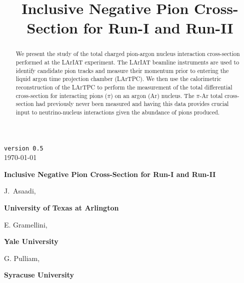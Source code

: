 \documentclass[a4paper]{article}
\title{Inclusive Negative Pion Cross-Section for Run-I and Run-II}
\begin{document}
\def\Journal#1#2#3#4{{#1} {\bf #2}, #3 (#4)}
\def\etal{{\it et\ al.}}
\def\numunue{\nu_\mu\rightarrow\nu_e}
\def\numunutau{\nu_\mu\rightarrow\nu_\tau}
\def\nuebar{\bar\nu_e}
\def\nue{\nu_e}
\def\nutau{\nu_\tau}
\def\numubar{\bar\nu_\mu}
\def\numu{\nu_\mu}
\def\ra{\rightarrow}
\def\numubarnuebar{\bar\nu_\mu\rightarrow\bar\nu_e}
\def\nuebarnumubar{\bar\nu_e\rightarrow\bar\nu_\mu}
\def\osc{\rightsquigarrow}
\def\inteni{{\cal I}_{pot}}
\def\fmerit{{\cal F}}
\begin{flushright}
{\tt version 0.5}\\ 
\today
\end{flushright}
\vspace*{0.6cm}
\begin{center}
{\Large \bf Inclusive Negative Pion Cross-Section for Run-I and Run-II} 
\vspace*{1.6cm}
\setcounter{footnote}{0}  
\def\A{\kern+.6ex\lower.42ex\hbox{$\scriptstyle \iota$}\kern-1.20ex a}
\def\E{\kern+.5ex\lower.42ex\hbox{$\scriptstyle \iota$}\kern-1.10ex e}
\small
\newcommand{\Aname}[2]{#1}
\def\titlefoot#1{\vspace{-0.3cm}\begin{center}{\bf #1}\end{center}}

\Aname{J.~Asaadi}{UTA},

\titlefoot{University of Texas at Arlington\label{UTA}}

\Aname{E. Gramellini}{Yale},

\titlefoot{Yale University\label{Yale}}

\Aname{G. Pulliam}{Syracuse},

\titlefoot{Syracuse University\label{Syracuse}}

\end{center}
\vspace*{1cm}


\begin{abstract}

We present the study of the total charged pion-argon nucleus interaction cross-section performed at the LArIAT experiment. The LArIAT beamline instruments are used to identify candidate pion tracks and measure their momentum prior to entering the liquid argon time projection chamber (LArTPC). We then use the calorimetric reconstruction of the LArTPC to perform the measurement of the total differential cross-section for interacting pions ($\pi$) on an argon (Ar) nucleus. The $\pi$-Ar total cross-section had previously never been measured and having this data provides crucial input to neutrino-nucleus interactions given the abundance of pions produced. 

\end{abstract} 
\end{document}
